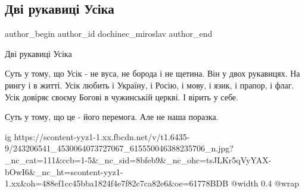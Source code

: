  
 
 
 
 
 
\subsection{Дві рукавиці Усіка}
\label{sec:27_09_2021.fb.dochinec_miroslav.1.dve_rukavicy_usika}
 
\ifcmt
 author_begin
   author_id dochinec_miroslav
 author_end
\fi

Дві рукавиці Усіка

Суть у тому, що Усік - не вуса, не борода і не щетина. Він у двох рукавицях. На
рингу і в житті. Усік любить і Україну, і Росію, і мову, і язик, і прапор, і
флаг. Усік довіряє своєму Богові в чужинській церкві. І вірить у себе.

Суть у тому, що це - його перемога. Але не наша поразка.

\ifcmt
  ig https://scontent-yyz1-1.xx.fbcdn.net/v/t1.6435-9/243206541_4530064073727067_615550046388235706_n.jpg?_nc_cat=111&ccb=1-5&_nc_sid=8bfeb9&_nc_ohc=tsJLKr5qVyYAX-bOwI6&_nc_ht=scontent-yyz1-1.xx&oh=488ef1cc45bba1824f4e7f82c7ca82e6&oe=61778BDB
  @width 0.4
  @wrap \parpic[r]
\fi

